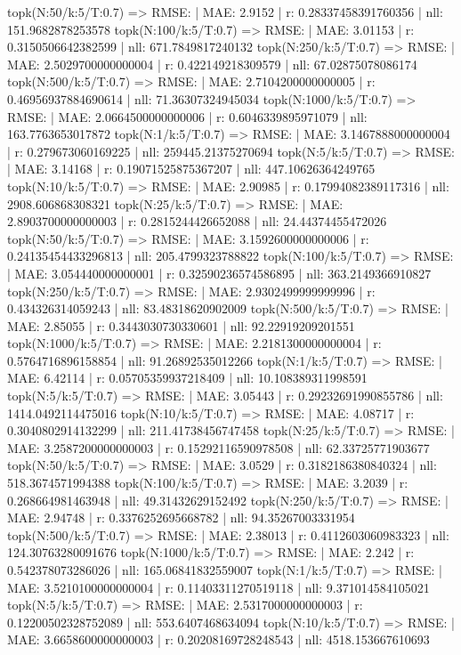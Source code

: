 topk(N:50/k:5/T:0.7) => RMSE: | MAE: 2.9152 | r: 0.28337458391760356 | nll: 151.9682878253578
topk(N:100/k:5/T:0.7) => RMSE: | MAE: 3.01153 | r: 0.3150506642382599 | nll: 671.7849817240132
topk(N:250/k:5/T:0.7) => RMSE: | MAE: 2.5029700000000004 | r: 0.422149218309579 | nll: 67.02875078086174
topk(N:500/k:5/T:0.7) => RMSE: | MAE: 2.7104200000000005 | r: 0.46956937884690614 | nll: 71.36307324945034
topk(N:1000/k:5/T:0.7) => RMSE: | MAE: 2.0664500000000006 | r: 0.6046339895971079 | nll: 163.7763653017872
topk(N:1/k:5/T:0.7) => RMSE: | MAE: 3.1467888000000004 | r: 0.279673060169225 | nll: 259445.21375270694
topk(N:5/k:5/T:0.7) => RMSE: | MAE: 3.14168 | r: 0.19071525875367207 | nll: 447.10626364249765
topk(N:10/k:5/T:0.7) => RMSE: | MAE: 2.90985 | r: 0.17994082389117316 | nll: 2908.606868308321
topk(N:25/k:5/T:0.7) => RMSE: | MAE: 2.8903700000000003 | r: 0.2815244426652088 | nll: 24.44374455472026
topk(N:50/k:5/T:0.7) => RMSE: | MAE: 3.1592600000000006 | r: 0.24135454433296813 | nll: 205.4799323788822
topk(N:100/k:5/T:0.7) => RMSE: | MAE: 3.054440000000001 | r: 0.32590236574586895 | nll: 363.2149366910827
topk(N:250/k:5/T:0.7) => RMSE: | MAE: 2.9302499999999996 | r: 0.434326314059243 | nll: 83.48318620902009
topk(N:500/k:5/T:0.7) => RMSE: | MAE: 2.85055 | r: 0.3443030730330601 | nll: 92.22919209201551
topk(N:1000/k:5/T:0.7) => RMSE: | MAE: 2.2181300000000004 | r: 0.5764716896158854 | nll: 91.26892535012266
topk(N:1/k:5/T:0.7) => RMSE: | MAE: 6.42114 | r: 0.05705359937218409 | nll: 10.108389311998591
topk(N:5/k:5/T:0.7) => RMSE: | MAE: 3.05443 | r: 0.29232691990855786 | nll: 1414.0492114475016
topk(N:10/k:5/T:0.7) => RMSE: | MAE: 4.08717 | r: 0.3040802914132299 | nll: 211.41738456747458
topk(N:25/k:5/T:0.7) => RMSE: | MAE: 3.2587200000000003 | r: 0.15292116590978508 | nll: 62.33725771903677
topk(N:50/k:5/T:0.7) => RMSE: | MAE: 3.0529 | r: 0.3182186380840324 | nll: 518.3674571994388
topk(N:100/k:5/T:0.7) => RMSE: | MAE: 3.2039 | r: 0.268664981463948 | nll: 49.31432629152492
topk(N:250/k:5/T:0.7) => RMSE: | MAE: 2.94748 | r: 0.3376252695668782 | nll: 94.35267003331954
topk(N:500/k:5/T:0.7) => RMSE: | MAE: 2.38013 | r: 0.4112603060983323 | nll: 124.30763280091676
topk(N:1000/k:5/T:0.7) => RMSE: | MAE: 2.242 | r: 0.542378073286026 | nll: 165.06841832559007
topk(N:1/k:5/T:0.7) => RMSE: | MAE: 3.5210100000000004 | r: 0.11403311270519118 | nll: 9.371014584105021
topk(N:5/k:5/T:0.7) => RMSE: | MAE: 2.5317000000000003 | r: 0.12200502328752089 | nll: 553.6407468634094
topk(N:10/k:5/T:0.7) => RMSE: | MAE: 3.6658600000000003 | r: 0.20208169728248543 | nll: 4518.153667610693
